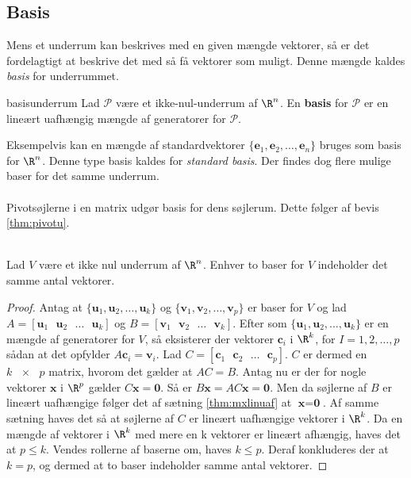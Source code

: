 \subsection{Basis}
Mens et underrum kan beskrives med en given mængde vektorer, så er det fordelagtigt at beskrive det med så få vektorer som muligt. 
Denne mængde kaldes \textit{basis} for underrummet.
%
\begin{defn}{}{basisunderrum}
Lad $\mathcal{P}$ være et ikke-nul-underrum af $\R^n$. 
En \textbf{basis} for $\mathcal{P}$ er en lineært uafhængig mængde af generatorer for $\mathcal{P}$.
\end{defn}
\noindent
Eksempelvis kan en mængde af standardvektorer $\{\textbf{e}_1,\textbf{e}_2,\ldots,\textbf{e}_n\}$ bruges som basis for $\R^n$.
Denne type basis kaldes for \textit{standard basis}.
Der findes dog flere mulige baser for det samme underrum.
\\\\
%
Pivotsøjlerne i en matrix udgør basis for dens søjlerum. Dette følger af bevis \ref{thm:pivotu}.
\\\\
\begin{thm}{}{}
Lad $V$ være et ikke nul underrum af $\R^n$. Enhver to baser for $V$ indeholder det samme antal vektorer.
\end{thm}
\begin{proof}
Antag at $\{\textbf{u}_1,\textbf{u}_2,\ldots,\textbf{u}_k\} $ og $\{\textbf{v}_1,\textbf{v}_2,\ldots,\textbf{v}_p\} $ er baser for $V$ og lad $A=[\textbf{u}_1 \text{ } \textbf{u}_2 \text{ }  \ldots \text{ } \textbf{u}_k] $ og $B=[\textbf{v}_1 \text{ } \textbf{v}_2 \text{ }  \ldots \text{ } \textbf{v}_k] $.
Efter som $\{\textbf{u}_1,\textbf{u}_2,\ldots,\textbf{u}_k\} $ er en mængde af generatorer for $V$, så eksisterer der vektorer $\textbf{c}_i$ i $\R^k$, for $I=1,2,\ldots,p$ sådan at det opfylder $A\textbf{c}_i=\textbf{v}_i$.
Lad $C=[\textbf{c}_1 \text{ } \textbf{c}_2 \text{ } \ldots \text{ } \textbf{c}_p]$.
$C$ er dermed en $ k \text{ } \times \text{ } p$ matrix, hvorom det gælder at $AC=B$.
Antag nu er der for nogle vektorer $\textbf{x}$ i $\R^p$ gælder $C\textbf{x}=\textbf{0}$. 
Så er $B\textbf{x}=AC\textbf{x}=\textbf{0}$. 
Men da søjlerne af $B$ er lineært uafhængige følger det af sætning \ref{thm:mxlinuaf} at $\textbf{x}=\textbf{0}$.
Af samme sætning haves det så at søjlerne af $C$ er lineært uafhængige vektorer i $\R^k$.
Da en mængde af vektorer i $\R^k$ med mere en k vektorer er lineært afhængig, haves det at $p\leq k$. 
Vendes rollerne af baserne om, haves $k \leq p$. 
Deraf konkluderes der at $k=p$, og dermed at to baser indeholder samme antal vektorer. 
\end{proof}